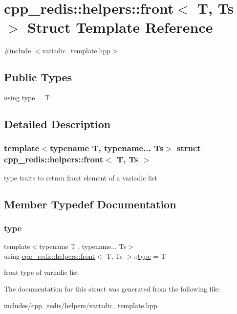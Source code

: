 \hypertarget{structcpp__redis_1_1helpers_1_1front}{}\section{cpp\+\_\+redis\+:\+:helpers\+:\+:front$<$ T, Ts $>$ Struct Template Reference}
\label{structcpp__redis_1_1helpers_1_1front}


{\ttfamily \#include $<$variadic\+\_\+template.\+hpp$>$}

\subsection*{Public Types}
\begin{DoxyCompactItemize}
\item 
using \hyperlink{structcpp__redis_1_1helpers_1_1front_a23178392c9417cc5ada75205931d1768}{type} = T
\end{DoxyCompactItemize}


\subsection{Detailed Description}
\subsubsection*{template$<$typename T, typename... Ts$>$\newline
struct cpp\+\_\+redis\+::helpers\+::front$<$ T, Ts $>$}

type traits to return front element of a variadic list 

\subsection{Member Typedef Documentation}
\mbox{\label{structcpp__redis_1_1helpers_1_1front_a23178392c9417cc5ada75205931d1768}} 
\subsubsection{\texorpdfstring{type}{type}}
{\footnotesize\ttfamily template$<$typename T , typename... Ts$>$ \\
using \hyperlink{structcpp__redis_1_1helpers_1_1front}{cpp\+\_\+redis\+::helpers\+::front}$<$ T, Ts $>$\+::\hyperlink{structcpp__redis_1_1helpers_1_1front_a23178392c9417cc5ada75205931d1768}{type} =  T}

front type of variadic list 

The documentation for this struct was generated from the following file\+:\begin{DoxyCompactItemize}
\item 
includes/cpp\+\_\+redis/helpers/variadic\+\_\+template.\+hpp\end{DoxyCompactItemize}
